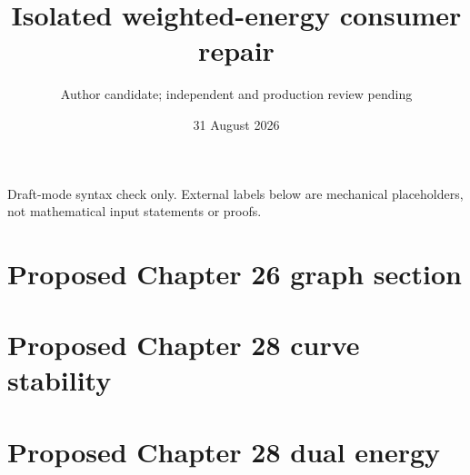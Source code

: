 \documentclass[11pt]{article}
\title{Isolated weighted-energy consumer repair}
\author{Author candidate; independent and production review pending}
\date{31 August 2026}
\begin{document}
\maketitle
\noindent Draft-mode syntax check only. External labels below are
mechanical placeholders, not mathematical input statements or proofs.

\section*{Proposed Chapter 26 graph section}

\section*{Proposed Chapter 28 curve stability}

\section*{Proposed Chapter 28 dual energy}

\end{document}
